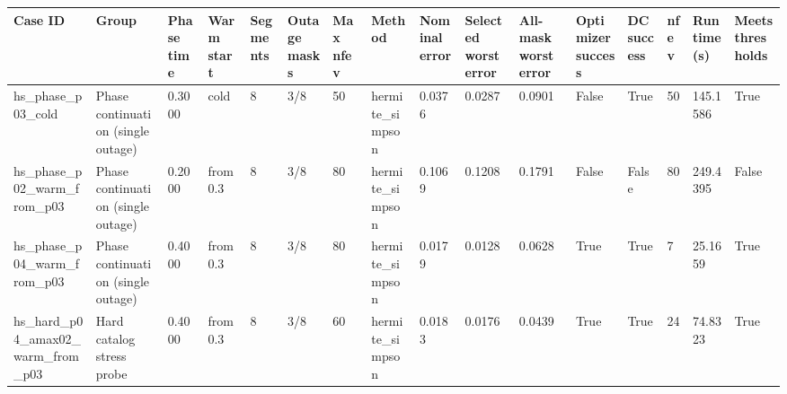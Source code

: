\begin{tabular}{llllllllllllllll}
\toprule
Case ID & Group & Phase time & Warm start & Segments & Outage masks & Max nfev & Method & Nominal error & Selected worst error & All-mask worst error & Optimizer success & DC success & nfev & Runtime (s) & Meets thresholds \\
\midrule
hs\_phase\_p03\_cold & Phase continuation (single outage) & 0.3000 & cold & 8 & 3/8 & 50 & hermite\_simpson & 0.0376 & 0.0287 & 0.0901 & False & True & 50 & 145.1586 & True \\
hs\_phase\_p02\_warm\_from\_p03 & Phase continuation (single outage) & 0.2000 & from 0.3 & 8 & 3/8 & 80 & hermite\_simpson & 0.1069 & 0.1208 & 0.1791 & False & False & 80 & 249.4395 & False \\
hs\_phase\_p04\_warm\_from\_p03 & Phase continuation (single outage) & 0.4000 & from 0.3 & 8 & 3/8 & 80 & hermite\_simpson & 0.0179 & 0.0128 & 0.0628 & True & True & 7 & 25.1659 & True \\
hs\_hard\_p04\_amax02\_warm\_from\_p03 & Hard catalog stress probe & 0.4000 & from 0.3 & 8 & 3/8 & 60 & hermite\_simpson & 0.0183 & 0.0176 & 0.0439 & True & True & 24 & 74.8323 & True \\
\bottomrule
\end{tabular}
